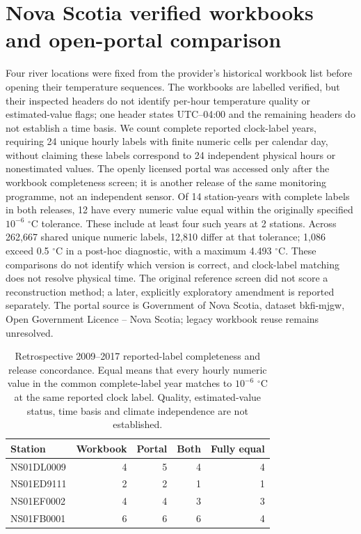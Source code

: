 \section{Nova Scotia verified workbooks and open-portal comparison}
Four river locations were fixed from the provider’s historical workbook list before opening their temperature sequences. The workbooks are labelled verified, but their inspected headers do not identify per-hour temperature quality or estimated-value flags; one header states UTC--04:00 and the remaining headers do not establish a time basis. We count complete reported clock-label years, requiring 24 unique hourly labels with finite numeric cells per calendar day, without claiming these labels correspond to 24 independent physical hours or nonestimated values. The openly licensed portal was accessed only after the workbook completeness screen; it is another release of the same monitoring programme, not an independent sensor. Of 14 station-years with complete labels in both releases, 12 have every numeric value equal within the originally specified $10^{-6}$ $^{\circ}$C tolerance. These include at least four such years at 2 stations. Across 262,667 shared unique numeric labels, 12,810 differ at that tolerance; 1,086 exceed 0.5 $^{\circ}$C in a post-hoc diagnostic, with a maximum 4.493 $^{\circ}$C. These comparisons do not identify which version is correct, and clock-label matching does not resolve physical time. The original reference screen did not score a reconstruction method; a later, explicitly exploratory amendment is reported separately. The portal source is Government of Nova Scotia, dataset bkfi-mjgw, Open Government Licence -- Nova Scotia; legacy workbook reuse remains unresolved.
\begin{table}[p]\centering\small
\caption{Retrospective 2009--2017 reported-label completeness and release concordance. Equal means that every hourly numeric value in the common complete-label year matches to $10^{-6}$ $^{\circ}$C at the same reported clock label. Quality, estimated-value status, time basis and climate independence are not established.}\label{tab:nova-scotia-reference}
\begin{tabular}{lrrrr}\toprule
Station & Workbook & Portal & Both & Fully equal\\\midrule
NS01DL0009 & 4 & 5 & 4 & 4\\
NS01ED9111 & 2 & 2 & 1 & 1\\
NS01EF0002 & 4 & 4 & 3 & 3\\
NS01FB0001 & 6 & 6 & 6 & 4\\
\bottomrule\end{tabular}
\end{table}

